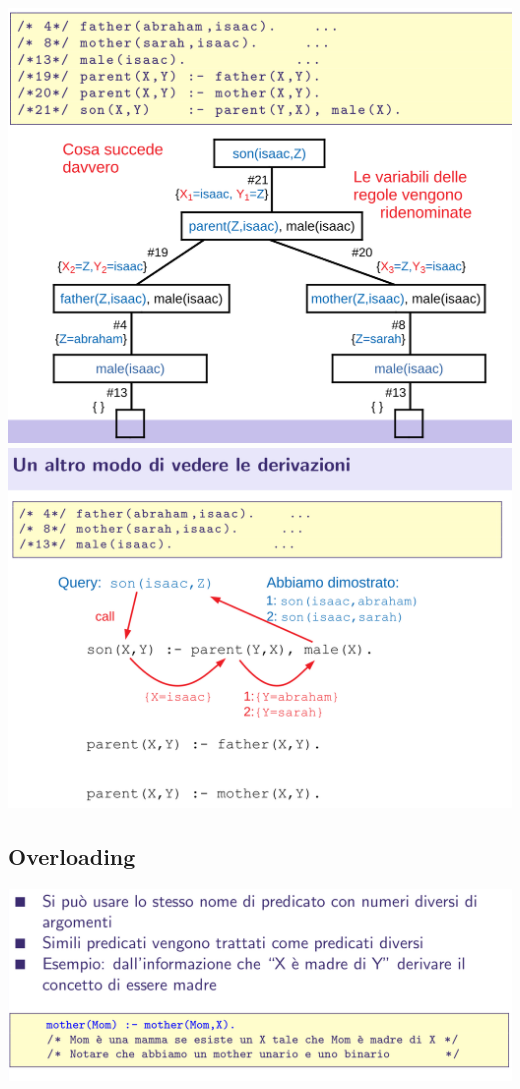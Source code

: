 \documentclass[10pt]{article}
\begin{document}
\\
\includegraphics[scale=0.25]{Immagini/pl20.png}
\\
\includegraphics[scale=0.25]{Immagini/pl21.png}
\subsection{Overloading}
\includegraphics[scale=0.25]{Immagini/pl22.png}
\end{document}
